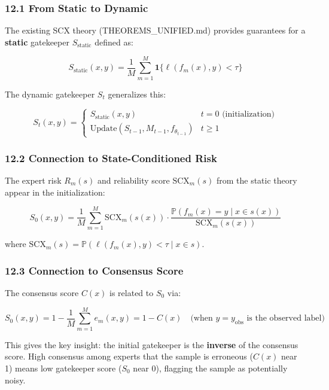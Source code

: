 \documentclass[
  12pt,
]{article}
\begin{document}
\subsubsection{12.1 From Static to
Dynamic}\label{from-static-to-dynamic}

The existing SCX theory (THEOREMS\_UNIFIED.md) provides guarantees for a
\textbf{static} gatekeeper \(S_{\text{static}}\) defined as:

\[S_{\text{static}}(x, y) = \frac{1}{M} \sum_{m=1}^M \mathbf{1}\{\ell(f_m(x), y) < \tau\}\]

The dynamic gatekeeper \(S_t\) generalizes this:

\[S_t(x, y) = \begin{cases}
S_{\text{static}}(x, y) & t = 0 \text{ (initialization)} \\
\text{Update}(S_{t-1}, M_{t-1}, f_{\theta_{t-1}}) & t \geq 1
\end{cases}\]

\subsubsection{12.2 Connection to State-Conditioned
Risk}\label{connection-to-state-conditioned-risk}

The expert risk \(R_m(s)\) and reliability score \(\text{SCX}_m(s)\)
from the static theory appear in the initialization:

\[S_0(x, y) = \frac{1}{M} \sum_{m=1}^M \text{SCX}_m(s(x)) \cdot \frac{\mathbb{P}(f_m(x) = y \mid x \in s(x))}{\text{SCX}_m(s(x))}\]

where
\(\text{SCX}_m(s) = \mathbb{P}(\ell(f_m(x), y) < \tau \mid x \in s)\).

\subsubsection{12.3 Connection to Consensus
Score}\label{connection-to-consensus-score}

The consensus score \(C(x)\) is related to \(S_0\) via:

\[S_0(x, y) = 1 - \frac{1}{M} \sum_{m=1}^M e_m(x, y) = 1 - C(x) \quad \text{(when } y = y_{\text{obs}} \text{ is the observed label)}\]

This gives the key insight: the initial gatekeeper is the
\textbf{inverse} of the consensus score. High consensus among experts
that the sample is erroneous (\(C(x)\) near 1) means low gatekeeper
score (\(S_0\) near 0), flagging the sample as potentially noisy.
\end{document}
